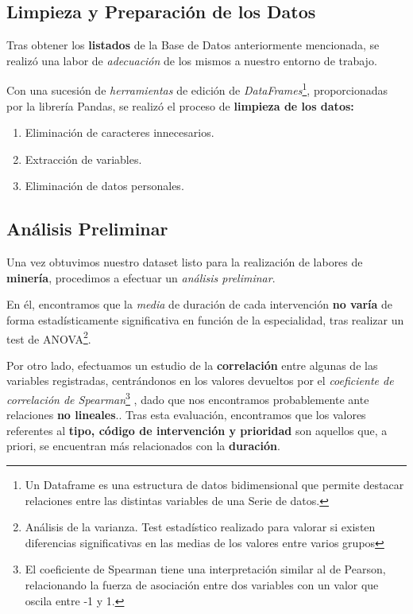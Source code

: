  \subsection{Limpieza y Preparación de los Datos}

 Tras obtener los \textbf{listados} de la Base de Datos anteriormente mencionada, se realizó una labor de \textit{adecuación} de los mismos a nuestro entorno de trabajo.

 Con una sucesión de \textit{herramientas} de edición de \textit{DataFrames}\footnote{Un Dataframe es una estructura de datos bidimensional que permite destacar relaciones entre las distintas variables de una Serie de datos. }, proporcionadas por la librería Pandas\cite{McKinney2010DataPython}, se realizó el proceso de \textbf{limpieza de los datos: }
 \begin{enumerate}
     \item Eliminación de caracteres innecesarios.
     \item Extracción de variables.
     \item Eliminación de datos personales.
 \end{enumerate}




\subsection{Análisis Preliminar}

 Una vez obtuvimos nuestro dataset listo para la realización de labores de \textbf{minería}, procedimos a efectuar un \textit{análisis preliminar}.

 En él, encontramos que la \textit{media} de duración de cada intervención \textbf{no varía} de forma estadísticamente significativa en función de la especialidad, tras realizar un test de ANOVA\footnote{Análisis de la varianza. Test estadístico realizado para valorar si existen diferencias significativas en las medias de los valores entre varios grupos}.


 Por otro lado, efectuamos un estudio de la \textbf{correlación} entre algunas de las variables registradas, centrándonos en los valores devueltos por el \textit{coeficiente de correlación de Spearman}\footnote{El coeficiente de Spearman tiene una interpretación similar al de Pearson, relacionando la fuerza de asociación entre dos variables con un valor que oscila entre -1 y 1.} , dado que nos encontramos probablemente ante relaciones \textbf{no lineales}.\cite{Page1963OrderedRanks}. 
 Tras esta evaluación, encontramos que los valores referentes al \textbf{tipo, código de intervención y prioridad} son aquellos que, a priori, se encuentran más relacionados con la \textbf{duración}.

